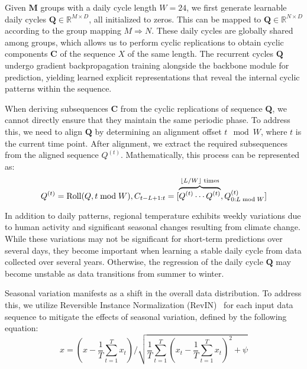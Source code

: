  Given $\textbf{M}$ groups with a daily cycle length $W=24$, we first generate learnable daily cycles $\mathbf{Q} \in \mathbb{R}^{M \times D}$, all initialized to zeros. This can be mapped to $\mathbf{Q} \in \mathbb{R}^{N \times D}$ according to the group mapping $M \Rightarrow N$. These daily cycles are globally shared among groups, which allows us to perform cyclic replications to obtain cyclic components $\textbf{C}$ of the sequence $\textit{X}$ of the same length. The recurrent cycles $\mathbf{Q}$ undergo gradient backpropagation training alongside the backbone module for prediction, yielding learned explicit representations that reveal the internal cyclic patterns within the sequence.

When deriving subsequences $\textbf{C}$ from the cyclic replications of sequence $\mathbf{Q}$, we cannot directly ensure that they maintain the same periodic phase. To address this, we need to align $\mathbf{Q}$ by determining an alignment offset $t\mod W$, where $t$ is the current time point. After alignment, we extract the required subsequences from the aligned sequence ${Q}^{(t)}$. Mathematically, this process can be represented as:
\begin{equation}
\setlength\abovedisplayskip{0pt}
Q^{(t)} = \operatorname{Roll}(Q, t \bmod W),
C_{t-L+1: t} = [\overbrace{Q^{(t)} \cdots Q^{(t)}}^{\lfloor L / W \rfloor \text{ times}}, Q_{0: L \bmod W}^{(t)}]
\end{equation}

 In addition to daily patterns, regional temperature exhibits weekly variations due to human activity and significant seasonal changes resulting from climate change. While these variations may not be significant for short-term predictions over several days, they become important when learning a stable daily cycle from data collected over several years. Otherwise, the regression of the daily cycle \( \mathbf{Q} \) may become unstable as data transitions from summer to winter.

Seasonal variation manifests as a shift in the overall data distribution. To address this, we utilize Reversible Instance Normalization (RevIN)~\cite{kim2021reversible} for each input data sequence to mitigate the effects of seasonal variation, defined by the following equation:
\begin{equation}
x = (x - \frac{1}{T} \sum_{t=1}^{T} x_t)/{\sqrt{\frac{1}{T} \sum_{t=1}^{T} (x_t - \frac{1}{T} \sum_{t=1}^{T} x_t)^2 + \psi }}
\end{equation}

